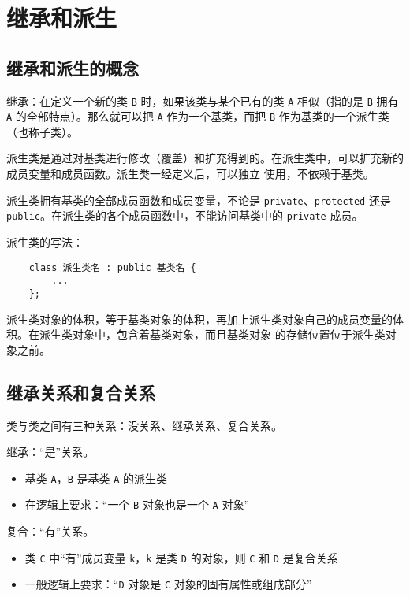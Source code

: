 \documentclass[UTF8]{ctexart}
\begin{document}
\section{继承和派生}
\subsection{继承和派生的概念}
继承：在定义一个新的类 \texttt{B} 时，如果该类与某个已有的类 \texttt{A} 相似（指的是 \texttt{B} 拥有
\texttt{A} 的全部特点）。那么就可以把 \texttt{A} 作为一个基类，而把 \texttt{B} 作为基类的一个派生类（也称子类）。

派生类是通过对基类进行修改（覆盖）和扩充得到的。在派生类中，可以扩充新的成员变量和成员函数。派生类一经定义后，可以独立
使用，不依赖于基类。

派生类拥有基类的全部成员函数和成员变量，不论是 \texttt{private}、\texttt{protected} 还是
\texttt{public}。在派生类的各个成员函数中，不能访问基类中的 \texttt{private} 成员。

派生类的写法：
\begin{verbatim}
    class 派生类名 : public 基类名 {
        ...
    };
\end{verbatim}

派生类对象的体积，等于基类对象的体积，再加上派生类对象自己的成员变量的体积。在派生类对象中，包含着基类对象，而且基类对象
的存储位置位于派生类对象之前。

\subsection{继承关系和复合关系}
类与类之间有三种关系：没关系、继承关系、复合关系。

继承：“是”关系。
\begin{itemize}
    \item 基类 \texttt{A}，\texttt{B} 是基类 \texttt{A} 的派生类
    \item 在逻辑上要求：“一个 \texttt{B} 对象也是一个 \texttt{A} 对象”
\end{itemize}

复合：“有”关系。
\begin{itemize}
    \item 类 \texttt{C} 中“有”成员变量 \texttt{k}，\texttt{k} 是类 \texttt{D} 的对象，则 \texttt{C} 和
    \texttt{D} 是复合关系
    \item 一般逻辑上要求：“\texttt{D} 对象是 \texttt{C} 对象的固有属性或组成部分”
\end{itemize}
\end{document}
